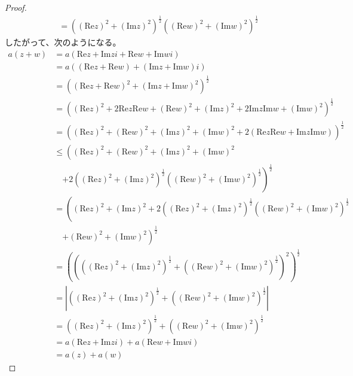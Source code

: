\documentclass[dvipdfmx]{jsarticle}
\begin{document}
\begin{proof}
\begin{align*}
&= \left( \left( \mathrm{Re}z \right)^{2} + \left( \mathrm{Im}z \right)^{2} \right)^{\frac{1}{2}}\left( \left( \mathrm{Re}w \right)^{2} + \left( \mathrm{Im}w \right)^{2} \right)^{\frac{1}{2}}
\end{align*}
したがって、次のようになる。
\begin{align*}
a(z + w) &= a\left( \mathrm{Re}z + \mathrm{Im}zi + \mathrm{Re}w + \mathrm{Im}wi \right)\\
&= a\left( \left( \mathrm{Re}z + \mathrm{Re}w \right) + \left( \mathrm{Im}z + \mathrm{Im}w \right)i \right)\\
&= \left( \left( \mathrm{Re}z + \mathrm{Re}w \right)^{2} + \left( \mathrm{Im}z + \mathrm{Im}w \right)^{2} \right)^{\frac{1}{2}}\\
&= \left( \left( \mathrm{Re}z \right)^{2} + 2\mathrm{Re}z\mathrm{Re}w + \left( \mathrm{Re}w \right)^{2} + \left( \mathrm{Im}z \right)^{2} + 2\mathrm{Im}z\mathrm{Im}w + \left( \mathrm{Im}w \right)^{2} \right)^{\frac{1}{2}}\\
&= \left( \left( \mathrm{Re}z \right)^{2} + \left( \mathrm{Re}w \right)^{2} + \left( \mathrm{Im}z \right)^{2} + \left( \mathrm{Im}w \right)^{2} + 2\left( \mathrm{Re}z\mathrm{Re}w + \mathrm{Im}z\mathrm{Im}w \right) \right)^{\frac{1}{2}}\\
&\leq \left( \left( \mathrm{Re}z \right)^{2} + \left( \mathrm{Re}w \right)^{2} + \left( \mathrm{Im}z \right)^{2} + \left( \mathrm{Im}w \right)^{2} \right. \\
&\quad \left. + 2\left( \left( \mathrm{Re}z \right)^{2} + \left( \mathrm{Im}z \right)^{2} \right)^{\frac{1}{2}}\left( \left( \mathrm{Re}w \right)^{2} + \left( \mathrm{Im}w \right)^{2} \right)^{\frac{1}{2}} \right)^{\frac{1}{2}}\\
&= \left( \left( \mathrm{Re}z \right)^{2} + \left( \mathrm{Im}z \right)^{2} + 2\left( \left( \mathrm{Re}z \right)^{2} + \left( \mathrm{Im}z \right)^{2} \right)^{\frac{1}{2}}\left( \left( \mathrm{Re}w \right)^{2} + \left( \mathrm{Im}w \right)^{2} \right)^{\frac{1}{2}} \right. \\
&\quad \left. + \left( \mathrm{Re}w \right)^{2} + \left( \mathrm{Im}w \right)^{2} \right)^{\frac{1}{2}}\\
&= \left( \left( \left( \left( \mathrm{Re}z \right)^{2} + \left( \mathrm{Im}z \right)^{2} \right)^{\frac{1}{2}} + \left( \left( \mathrm{Re}w \right)^{2} + \left( \mathrm{Im}w \right)^{2} \right)^{\frac{1}{2}} \right)^{2} \right)^{\frac{1}{2}}\\
&= \left| \left( \left( \mathrm{Re}z \right)^{2} + \left( \mathrm{Im}z \right)^{2} \right)^{\frac{1}{2}} + \left( \left( \mathrm{Re}w \right)^{2} + \left( \mathrm{Im}w \right)^{2} \right)^{\frac{1}{2}} \right|\\
&= \left( \left( \mathrm{Re}z \right)^{2} + \left( \mathrm{Im}z \right)^{2} \right)^{\frac{1}{2}} + \left( \left( \mathrm{Re}w \right)^{2} + \left( \mathrm{Im}w \right)^{2} \right)^{\frac{1}{2}}\\
&= a\left( \mathrm{Re}z + \mathrm{Im}zi \right) + a\left( \mathrm{Re}w + \mathrm{Im}wi \right)\\
&= a(z) + a(w)
\end{align*}
\end{proof}\par
\end{document}
